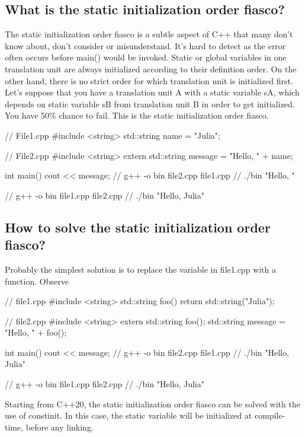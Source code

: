 \documentclass{report}
\begin{document}
\subsection{What is the static initialization order fiasco?}
\bigbreak \noindent 
The static initialization order fiasco is a subtle aspect of C++ that
many don’t know about, don’t consider or misunderstand. It’s hard
to detect as the error often occurs before main() would be invoked.
\bigbreak \noindent 
Static or global variables in one translation unit are always initialized according to their definition order. On the other hand, there is
no strict order for which translation unit is initialized first.
\bigbreak \noindent 
Let’s suppose that you have a translation unit A with a static
variable sA, which depends on static variable sB from translation
unit B in order to get initialized. You have 50\% chance to fail. This
is the static initialization order fiasco.
\bigbreak \noindent 
\begin{cppcode}
// File1.cpp
#include <string>
std::string name = "Julia";

// File2.cpp
#include <string>
extern std::string message = "Hello, " + name;

int main() {cout << message;}
// g++ -o bin file2.cpp file1.cpp
// ./bin "Hello, "

// g++ -o bin file1.cpp file2.cpp
// ./bin "Hello, Julia"
\end{cppcode}

\bigbreak \noindent 
\subsection{How to solve the static initialization order fiasco?}
\bigbreak \noindent 
Probably the simplest solution is to replace the variable in file1.cpp with a function. Observe
\bigbreak \noindent 
\begin{cppcode}
// file1.cpp
#include <string>
std::string foo() {
    return std::string("Julia");
}

// file2.cpp
#include <string>
extern std::string foo();
std::string message = "Hello, " + foo();

int main() {cout << message;}
// g++ -o bin file2.cpp file1.cpp
// ./bin "Hello, Julia"

// g++ -o bin file1.cpp file2.cpp
// ./bin "Hello, Julia"
\end{cppcode}

\bigbreak \noindent 
Starting from C++20, the static initialization order fiasco can be solved with the use of constinit. In this case, the static variable will be initialized at compile-time, before any linking.
\end{document}
